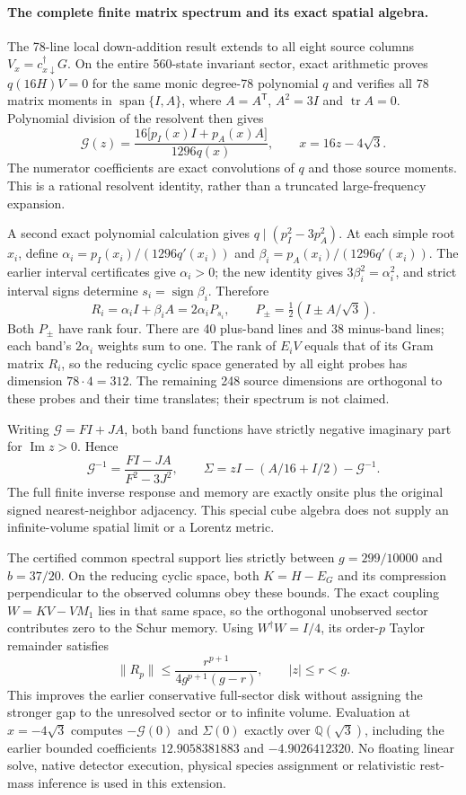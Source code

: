 \paragraph{The complete finite matrix spectrum and its exact spatial algebra.}
The 78-line local down-addition result extends to all eight source columns
$V_x=c_{x\downarrow}^\dagger G$.  On the entire 560-state invariant
sector, exact arithmetic proves $q(16H)V=0$ for the same monic degree-78
polynomial $q$ and verifies all 78 matrix moments in
$\operatorname{span}\{I,A\}$, where $A=A^\mathsf{T}$,
$A^2=3I$ and $\operatorname{tr}A=0$.
Polynomial division of the resolvent then gives
\[
\mathcal G(z)=
 \frac{16\bigl[p_I(x)I+p_A(x)A\bigr]}{1296q(x)},
\qquad x=16z-4\sqrt3.
\]
The numerator coefficients are exact convolutions of $q$ and those
source moments.  This is a rational resolvent identity, rather than a
truncated large-frequency expansion.

A second exact polynomial calculation gives
$q\mid(p_I^2-3p_A^2)$.  At each simple root $x_i$, define
$\alpha_i=p_I(x_i)/(1296q'(x_i))$ and
$\beta_i=p_A(x_i)/(1296q'(x_i))$.
The earlier interval certificates give $\alpha_i>0$; the new identity
gives $3\beta_i^2=\alpha_i^2$, and strict interval signs determine
$s_i=\operatorname{sign}\beta_i$.  Therefore
\[
R_i=\alpha_i I+\beta_i A=2\alpha_i P_{s_i},
\qquad P_\pm=\tfrac12(I\pm A/\sqrt3).
\]
Both $P_\pm$ have rank four.  There are 40 plus-band lines and 38
minus-band lines; each band's $2\alpha_i$ weights sum to one.
The rank of $E_iV$ equals that of its Gram matrix $R_i$, so the reducing
cyclic space generated by all eight probes has dimension
$78\cdot4=312$.  The remaining 248 source dimensions are orthogonal to
these probes and their time translates; their spectrum is not claimed.

Writing $\mathcal G=FI+JA$, both band functions have strictly negative
imaginary part for $\operatorname{Im}z>0$.  Hence
\[
\mathcal G^{-1}=\frac{FI-JA}{F^2-3J^2},
\qquad
\Sigma=zI-(A/16+I/2)-\mathcal G^{-1}.
\]
The full finite inverse response and memory are exactly onsite plus the
original signed nearest-neighbor adjacency.  This special cube algebra
does not supply an infinite-volume spatial limit or a Lorentz metric.

The certified common spectral support lies strictly between
$g=299/10000$ and $b=37/20$.  On the reducing cyclic space, both
$K=H-E_G$ and its compression perpendicular to the observed columns obey
these bounds.  The exact coupling $W=KV-VM_1$ lies in that same space,
so the orthogonal unobserved sector contributes zero to the Schur memory.
Using $W^\dagger W=I/4$, its order-$p$ Taylor remainder satisfies
\[
\|R_p\|\leq\frac{r^{p+1}}{4g^{p+1}(g-r)},
\qquad |z|\leq r<g.
\]
This improves the earlier conservative full-sector disk without
assigning the stronger gap to the unresolved sector or to infinite volume.
Evaluation at $x=-4\sqrt3$ computes $-\mathcal G(0)$ and
$\Sigma(0)$ exactly over $\mathbb Q(\sqrt3)$, including the earlier
bounded coefficients $12.9058381883$ and $-4.9026412320$.
No floating linear solve, native detector execution, physical species
assignment or relativistic rest-mass inference is used in this extension.

